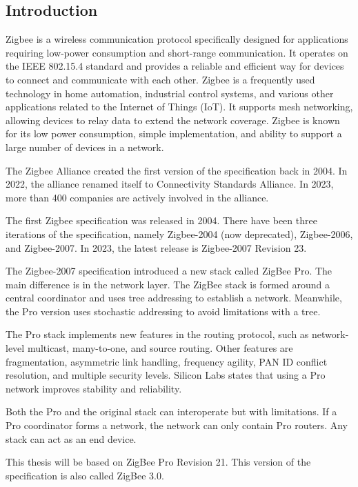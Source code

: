\subsection{Introduction}
\label{zb:into}
Zigbee is a wireless communication protocol specifically designed for
applications requiring low-power consumption and short-range communication.
It operates on the IEEE 802.15.4 standard and provides a reliable and efficient way
for devices to connect and communicate with each other.
Zigbee is a frequently used technology in home automation, industrial control systems,
and various other applications related to the Internet of Things (IoT).
It supports mesh networking, allowing devices to relay data to extend the network
coverage. Zigbee is known for its low power consumption, simple implementation, and
ability to support a large number of devices in a network.

The Zigbee Alliance created the first version of the specification back in 2004.
In 2022, the alliance renamed itself to Connectivity Standards Alliance.
In 2023, more than 400 companies are actively involved in the alliance. \cite{csa:members}

The first Zigbee specification was released in 2004.
There have been three iterations of the specification, namely Zigbee-2004 (now deprecated), Zigbee-2006, and Zigbee-2007.
In 2023, the latest release is Zigbee-2007 Revision 23.

The Zigbee-2007 specification introduced a new stack called ZigBee Pro. The main difference is in the network layer.
The ZigBee stack is formed around a central coordinator and uses tree addressing to establish a network. Meanwhile,
the Pro version uses stochastic addressing to avoid limitations with a tree. \cite{zigbee:silabs:ug103:2}

The Pro stack implements new features in the routing protocol, such as network-level multicast, many-to-one, and source routing.
Other features are fragmentation, asymmetric link handling, frequency agility, PAN ID conflict resolution, and multiple security levels.
Silicon Labs states that using a Pro network improves stability and reliability.

Both the Pro and the original stack can interoperate but with limitations.
If a Pro coordinator forms a network, the network can only contain Pro routers.
Any stack can act as an end device. \cite{zigbee:silabs:ug103:2}

This thesis will be based on ZigBee Pro Revision 21. This version of the specification is also called ZigBee 3.0.

